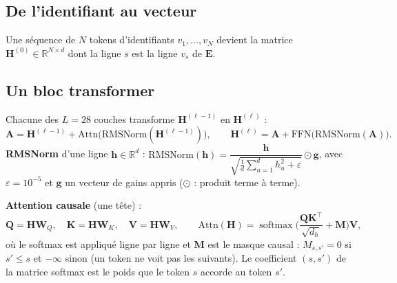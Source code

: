 \documentclass[11pt,a4paper]{article}
\newcommand{\R}{\mathbb{R}}
\newcommand{\vect}[1]{\bm{#1}}
\newcommand{\mat}[1]{\mathbf{#1}}
\DeclareMathOperator{\softmax}{softmax}
\begin{document}
\subsection{De l'identifiant au vecteur}
Une séquence de $N$ tokens d'identifiants $v_1,\dots,v_N$ devient la matrice
$\mat{H}^{(0)}\in\R^{N\times d}$ dont la ligne $s$ est la ligne $v_s$ de $\mat{E}$.

\subsection{Un bloc transformer}
Chacune des $L=28$ couches transforme $\mat{H}^{(\ell-1)}$ en $\mat{H}^{(\ell)}$ :
\[
\mat{A} = \mat{H}^{(\ell-1)} + \mathrm{Attn}\big(\mathrm{RMSNorm}(\mat{H}^{(\ell-1)})\big),\qquad
\mat{H}^{(\ell)} = \mat{A} + \mathrm{FFN}\big(\mathrm{RMSNorm}(\mat{A})\big).
\]
\textbf{RMSNorm} d'une ligne $\vect{h}\in\R^d$ :
$\mathrm{RMSNorm}(\vect{h}) = \dfrac{\vect{h}}{\sqrt{\frac1d\sum_{u=1}^{d}h_u^2+\varepsilon}}\odot\vect{g}$,
avec $\varepsilon=10^{-5}$ et $\vect{g}$ un vecteur de gains appris ($\odot$ : produit terme à terme).

\textbf{Attention causale} (une tête) :
\[
\mat{Q}=\mat{H}\mat{W}_Q,\quad \mat{K}=\mat{H}\mat{W}_K,\quad \mat{V}=\mat{H}\mat{W}_V,\qquad
\mathrm{Attn}(\mat{H}) = \softmax\!\Big(\frac{\mat{Q}\mat{K}^\top}{\sqrt{d_h}} + \mat{M}\Big)\mat{V},
\]
où le softmax est appliqué ligne par ligne et $\mat{M}$ est le masque causal : $M_{s,s'}=0$ si
$s'\le s$ et $-\infty$ sinon (un token ne voit pas les suivants). Le coefficient $(s,s')$ de la
matrice softmax est le poids que le token $s$ accorde au token $s'$.
\end{document}
